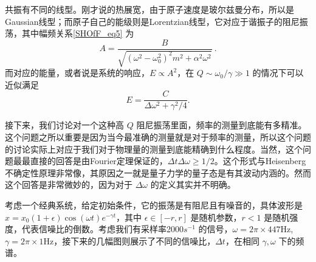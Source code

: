共振有不同的线型。刚才说的热展宽，由于原子速度是玻尔兹曼分布，所以是Gaussian线型；而原子自己的能级则是Lorentzian线型，它对应于谐振子的阻尼振荡，其中幅频关系\autoref{SHOfF_eq5} 为
\begin{equation}
A = \frac{B}{\sqrt{(\omega^2 - \omega_0^2)^2 m^2 + \alpha^2\omega^2}}~.
\end{equation}
而对应的能量，或者说是系统的响应，$E\propto A^2$，在 $Q\sim\omega_0/\gamma\gg1$ 的情况下可以近似满足
\begin{equation}
E = \frac{C}{\Delta\omega^2 + \gamma^2/4}. 
\end{equation}

接下来，我们讨论对一个这种高 $Q$ 阻尼振荡里面，频率的测量到底能有多精准。这个问题之所以重要是因为当今最准确的测量就是对于频率的测量，所以这个问题的讨论实际上对应于我们对于物理量的测量到底能精确到什么程度。当然，这个问题最最直接的回答是由Fourier定理保证的，$\Delta t\Delta \omega\ge1/2$。这个形式与Heisenberg不确定性原理非常像，其原因之一就是量子力学的量子态是有其波动内涵的。然而这个回答是非常微妙的，因为对于 $\Delta\omega$ 的定义其实并不明确。

考虑一个经典系统，给定初始条件，它的振荡是有阻尼且有噪音的，具体波形是 $x=x_0(1+\epsilon)\cos(\omega t)e^{-\gamma t}$，其中 $\epsilon\in[-r,r]$ 是随机参数，$r<1$ 是随机强度，代表信噪比的倒数。考虑我们有采样率2000$s^{-1}$ 的信号，$\omega=2\pi\times447$Hz, $\gamma=2\pi\times1$Hz，接下来的几幅图则展示了不同的信噪比，$\Delta t$，在相同 $\gamma, \omega$ 下的频谱。
